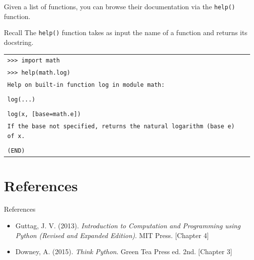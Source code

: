 \documentclass[t,handout,9pt]{beamer}
\begin{document}
\begin{frame}
Given a list of functions, you can browse their documentation via the \texttt{help()} function.
\begin{block}{Recall}
The \texttt{help()} function takes as input the name of a function and returns its docstring.
\end{block}
\vfill
\begin{table}[]
\begin{flushleft}
\begin{tabular}{ll}
\texttt{>{}>{}> import math}        & \\
\texttt{>{}>{}> help(math.log)}        & \\
\texttt{Help on built-in function log in module math:}        &\\
\texttt{\quad}        &\\
\texttt{log(...)}        &\\
\texttt{\quad}        &\\
\texttt{\quad log(x, [base=math.e])}        &\\
\texttt{\quad If the base not specified, returns the natural logarithm (base e) of x.}        &\\
\texttt{\quad}  &\\
\texttt{(END)}  &\\
\end{tabular}
\end{flushleft}
\end{table}
\vfill
\end{frame}
\section{References}
\begin{frame}{References}
\begin{itemize}
	\item Guttag, J. V. (2013). \textit{Introduction to Computation and Programming using Python (Revised and Expanded Edition)}. MIT Press. [Chapter 4]
	\item Downey, A. (2015). \textit{Think Python}. Green Tea Press ed. 2nd. [Chapter 3]
\end{itemize}
\end{frame}
\end{document}
